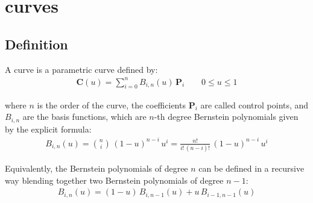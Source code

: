 \section{\Bezier curves}

\subsection{Definition}

A \Bezier curve is a parametric curve defined by:
\begin{align}
\label{eq:def_bezier_curve}
\mathbf{C}(u)=\sum_{i=0}^{n} B_{i,n}(u)\, \mathbf{P}_{i} \quad \quad 0 \leq u \leq 1
\end{align}

where $n$ is the order of the curve, the coefficients $\mathbf{P}_{i}$ are called control points, and $B_{i,n}$ are the basis functions, which are $n$-th degree Bernstein polynomials given by the explicit formula:
\begin{align}
    \label{eq:def_bernstein_explicit}
    B_{i,n}(u) = \binom{n}{i}  \, (1-u)^{n-i} \, u^{i} = \frac{n!}{i! \, (n-i)!} \, (1-u)^{n-i} \, u^{i}  
\end{align}

Equivalently, the Bernstein polynomials of degree $n$ can be defined in a recursive way blending together two Bernstein polynomials of degree $n-1$:
\begin{align}
    \label{eq:def_bernstein_recursive}
    B_{i,n}(u) = (1-u) \, B_{i,n-1}(u) + u \, B_{i-1,n-1}(u)
\end{align}


